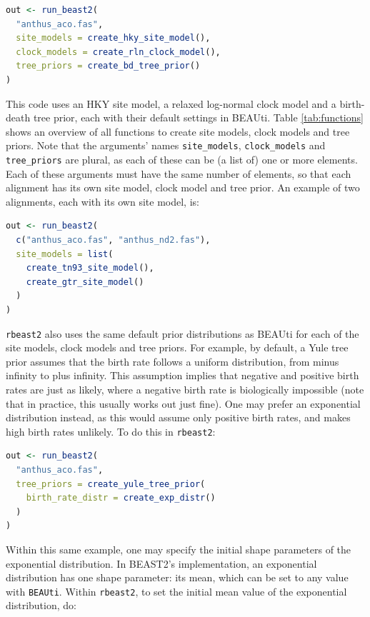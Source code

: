 \documentclass{article}
\begin{document}
\begin{lstlisting}[language=R, floatplacement=H]
out <- run_beast2(
  "anthus_aco.fas",
  site_models = create_hky_site_model(),
  clock_models = create_rln_clock_model(),
  tree_priors = create_bd_tree_prior()
)
\end{lstlisting}

This code uses an HKY site model, a relaxed log-normal clock model and a 
birth-death tree prior, each with their default settings in BEAUti.
Table \ref{tab:functions} shows an overview of all functions to 
create site models, clock models and tree priors.
Note that the arguments' names \verb;site_models;, \verb;clock_models; 
and \verb;tree_priors; are plural, as each of these
can be (a list of) one or more elements. Each of these arguments must 
have the same number of elements, so that each alignment has its
own site model, clock model and tree prior. 
An example of two alignments, each with its own site model, is:

\begin{lstlisting}[language=R, floatplacement=H]
out <- run_beast2(
  c("anthus_aco.fas", "anthus_nd2.fas"),
  site_models = list(
    create_tn93_site_model(), 
    create_gtr_site_model()
  )
)
\end{lstlisting}

\verb;rbeast2; also uses the same default prior distributions as BEAUti 
for each of the site models, clock models and tree priors. 
For example, by default, a Yule tree prior assumes that the birth rate 
follows a uniform distribution, 
from minus infinity to plus infinity. 
This assumption implies that negative and positive birth rates are just as likely, 
where a negative birth rate is biologically impossible (note that 
in practice, this usually works out just fine).
One may prefer an exponential distribution instead, 
as this would assume only positive birth rates, 
and makes high birth rates unlikely.
To do this in \verb;rbeast2;:

\begin{lstlisting}[language=R, floatplacement=H]
out <- run_beast2(
  "anthus_aco.fas",
  tree_priors = create_yule_tree_prior(
    birth_rate_distr = create_exp_distr()    
  )
)
\end{lstlisting}

Within this same example, one may specify
the initial shape parameters of the exponential distribution.
In BEAST2's implementation, an exponential distribution 
has one shape parameter: its mean, which can be set to any
value with \verb;BEAUti;. Within \verb;rbeast2;, to set the 
initial mean value of the exponential distribution, do: 
\end{document}
